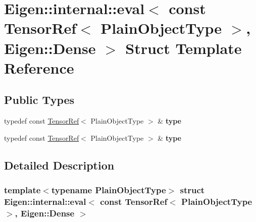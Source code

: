 \hypertarget{struct_eigen_1_1internal_1_1eval_3_01const_01_tensor_ref_3_01_plain_object_type_01_4_00_01_eigen_1_1_dense_01_4}{}\section{Eigen\+:\+:internal\+:\+:eval$<$ const Tensor\+Ref$<$ Plain\+Object\+Type $>$, Eigen\+:\+:Dense $>$ Struct Template Reference}
\label{struct_eigen_1_1internal_1_1eval_3_01const_01_tensor_ref_3_01_plain_object_type_01_4_00_01_eigen_1_1_dense_01_4}
\subsection*{Public Types}
\begin{DoxyCompactItemize}
\item 
\mbox{\label{struct_eigen_1_1internal_1_1eval_3_01const_01_tensor_ref_3_01_plain_object_type_01_4_00_01_eigen_1_1_dense_01_4_aada22dd3db4b25bca8703b5bf0e8a0a7}} 
typedef const \hyperlink{class_eigen_1_1_tensor_ref}{Tensor\+Ref}$<$ Plain\+Object\+Type $>$ \& {\bfseries type}
\item 
\mbox{\label{struct_eigen_1_1internal_1_1eval_3_01const_01_tensor_ref_3_01_plain_object_type_01_4_00_01_eigen_1_1_dense_01_4_aada22dd3db4b25bca8703b5bf0e8a0a7}} 
typedef const \hyperlink{class_eigen_1_1_tensor_ref}{Tensor\+Ref}$<$ Plain\+Object\+Type $>$ \& {\bfseries type}
\end{DoxyCompactItemize}


\subsection{Detailed Description}
\subsubsection*{template$<$typename Plain\+Object\+Type$>$\newline
struct Eigen\+::internal\+::eval$<$ const Tensor\+Ref$<$ Plain\+Object\+Type $>$, Eigen\+::\+Dense $>$}



